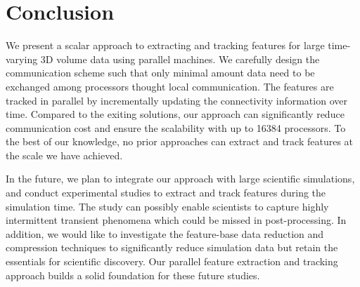 \section{Conclusion}

We present a scalar approach to extracting and tracking features for large time-varying 3D volume data using parallel machines. We carefully design the communication scheme such that only minimal amount data need to be exchanged among processors thought local communication. The features are tracked in parallel by incrementally updating the connectivity information over time. Compared to the exiting solutions, our approach can significantly reduce  communication cost and ensure the scalability with up to 16384 processors. To the best of our knowledge, no prior approaches can extract and track features at the scale we have achieved. 

In the future, we plan to integrate our approach with large scientific simulations, and conduct experimental studies to extract and track features during the simulation time. The study can possibly enable scientists to capture highly intermittent transient phenomena which could be missed in post-processing. In addition, we would like to investigate the feature-base data reduction and compression techniques to significantly reduce simulation data but retain the essentials for scientific discovery. Our parallel feature extraction and tracking approach builds a solid foundation for these future studies.   

